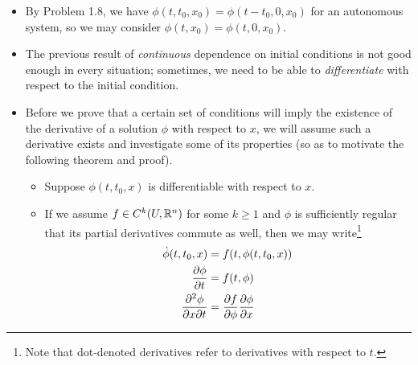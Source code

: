 \documentclass[../notes.tex]{subfiles}
\begin{document}
\begin{itemize}
\begin{proof}
        \begin{align*}
            \Delta(t) &= \left| \int_{t_0}^tf(r,\phi(r,t_0,y_0))\dd{r}-\int_{s_0}^tf(r,\phi(r,s_0,y_0))\dd{r} \right|\\
            &= \left| \int_{t_0}^{s_0}f(r,\phi(r,t_0,y_0))\dd{r}+\int_{s_0}^tf(r,\phi(r,t_0,y_0))\dd{r}-\int_{s_0}^tf(r,\phi(r,s_0,y_0))\dd{r} \right|\\
            &\leq \int_{t_0}^{s_0}|f(r,\phi(r,t_0,y_0))|\dd{r}+\int_{s_0}^t|f(r,\phi(r,t_0,y_0))-f(r,\phi(r,s_0,y_0))|\dd{r}\\
            &\leq |t_0-s_0|M+L\int_{s_0}^t\Delta(r)\dd{r}
        \end{align*}
        Therefore, by Gr\"{o}nwall's inequality (as in Problem \ref{prb:2.12}; note that $\gamma=0$ here),
        \begin{equation*}
            \Delta(t) \leq |t_0-s_0|M\e[L|t-s_0|]
        \end{equation*}
        as desired.
    \end{proof}
    \item By Problem 1.8, we have $\phi(t,t_0,x_0)=\phi(t-t_0,0,x_0)$ for an autonomous system, so we may consider $\phi(t,x_0)=\phi(t,0,x_0)$.
    \item The previous result of \emph{continuous} dependence on initial conditions is not good enough in every situation; sometimes, we need to be able to \emph{differentiate} with respect to the initial condition.
    \item {}Before we prove that a certain set of conditions will imply the existence of the derivative of a solution $\phi$ with respect to $x$, we will assume such a derivative exists and investigate some of its properties (so as to motivate the following theorem and proof).
    \begin{itemize}
        \item Suppose $\phi(t,t_0,x)$ is differentiable with respect to $x$.
        \item If we assume $f\in C^k(U,\mathbb{R}^n)$ for some $k\geq 1$ and $\phi$ is sufficiently regular that its partial derivatives commute as well, then we may write\footnote{Note that dot-denoted derivatives refer to derivatives with respect to $t$.}
        \begin{align*}
            \dot{\phi}(t,t_0,x) &= f(t,\phi(t,t_0,x))\\
            \pdv{\phi}{t} &= f(t,\phi)\\
            \pdv{\phi}{x}{t} &= \pdv{f}{\phi}\pdv{\phi}{x}\\

\end{align*}
\end{itemize}
\end{itemize}
\end{document}
